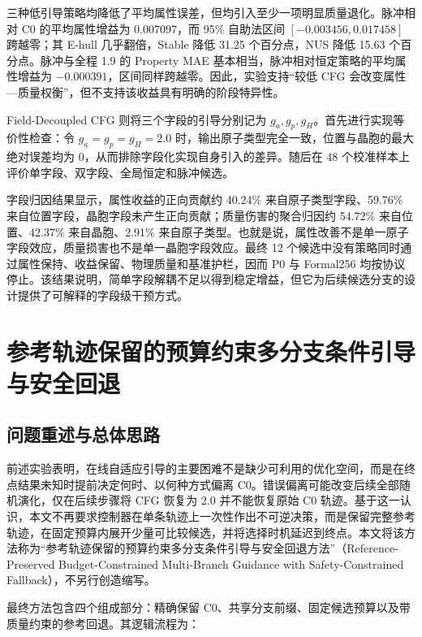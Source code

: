 三种低引导策略均降低了平均属性误差，但均引入至少一项明显质量退化。脉冲相对 C0 的平均属性增益为 0.007097，而 95\% 自助法区间 \([-0.003456,0.017458]\) 跨越零；其 E-hull 几乎翻倍，Stable 降低 31.25 个百分点，NUS 降低 15.63 个百分点。脉冲与全程 1.9 的 Property MAE 基本相当，脉冲相对恒定策略的平均属性增益为 \(-0.000391\)，区间同样跨越零。因此，实验支持``较低 CFG 会改变属性---质量权衡''，但不支持该收益具有明确的阶段特异性。

Field-Decoupled CFG 则将三个字段的引导分别记为 \(g_a,g_p,g_H\)。首先进行实现等价性检查：令 \(g_a=g_p=g_H=2.0\) 时，输出原子类型完全一致，位置与晶胞的最大绝对误差均为 0，从而排除字段化实现自身引入的差异。随后在 48 个校准样本上评价单字段、双字段、全局恒定和脉冲候选。

字段归因结果显示，属性收益的正向贡献约 40.24\% 来自原子类型字段、59.76\% 来自位置字段，晶胞字段未产生正向贡献；质量伤害的聚合归因约 54.72\% 来自位置、42.37\% 来自晶胞、2.91\% 来自原子类型。也就是说，属性改善不是单一原子字段效应，质量损害也不是单一晶胞字段效应。最终 12 个候选中没有策略同时通过属性保持、收益保留、物理质量和基准护栏，因而 P0 与 Formal256 均按协议停止。该结果说明，简单字段解耦不足以得到稳定增益，但它为后续候选分支的设计提供了可解释的字段级干预方式。

\section{参考轨迹保留的预算约束多分支条件引导与安全回退}

\subsection{问题重述与总体思路}

前述实验表明，在线自适应引导的主要困难不是缺少可利用的优化空间，而是在终点结果未知时提前决定何时、以何种方式偏离 C0。错误偏离可能改变后续全部随机演化，仅在后续步骤将 CFG 恢复为 2.0 并不能恢复原始 C0 轨迹。基于这一认识，本文不再要求控制器在单条轨迹上一次性作出不可逆决策，而是保留完整参考轨迹，在固定预算内展开少量可比较候选，并将选择时机延迟到终点。本文将该方法称为``参考轨迹保留的预算约束多分支条件引导与安全回退方法''（Reference-Preserved Budget-Constrained Multi-Branch Guidance with Safety-Constrained Fallback），不另行创造缩写。

最终方法包含四个组成部分：精确保留 C0、共享分支前缀、固定候选预算以及带质量约束的参考回退。其逻辑流程为：

\begin{Shaded}
\begin{Highlighting}[]
\end{Highlighting}
\end{Shaded}

